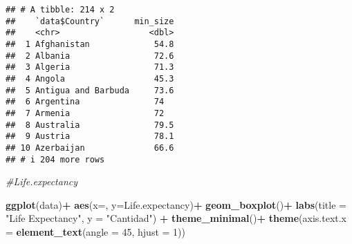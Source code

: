 \documentclass[
]{article}
\newenvironment{Shaded}{\begin{snugshade}}{\end{snugshade}}
\newcommand{\AttributeTok}[1]{\textcolor[rgb]{0.13,0.29,0.53}{#1}}
\newcommand{\CommentTok}[1]{\textcolor[rgb]{0.56,0.35,0.01}{\textit{#1}}}
\newcommand{\ConstantTok}[1]{\textcolor[rgb]{0.56,0.35,0.01}{#1}}
\newcommand{\DecValTok}[1]{\textcolor[rgb]{0.00,0.00,0.81}{#1}}
\newcommand{\FunctionTok}[1]{\textcolor[rgb]{0.13,0.29,0.53}{\textbf{#1}}}
\newcommand{\NormalTok}[1]{#1}
\newcommand{\SpecialCharTok}[1]{\textcolor[rgb]{0.81,0.36,0.00}{\textbf{#1}}}
\newcommand{\StringTok}[1]{\textcolor[rgb]{0.31,0.60,0.02}{#1}}
\begin{document}
\begin{Shaded}
\end{Shaded}

\begin{verbatim}
## # A tibble: 214 x 2
##    `data$Country`      min_size
##    <chr>                  <dbl>
##  1 Afghanistan             54.8
##  2 Albania                 72.6
##  3 Algeria                 71.3
##  4 Angola                  45.3
##  5 Antigua and Barbuda     73.6
##  6 Argentina               74  
##  7 Armenia                 72  
##  8 Australia               79.5
##  9 Austria                 78.1
## 10 Azerbaijan              66.6
## # i 204 more rows
\end{verbatim}

\begin{Shaded}
\begin{Highlighting}[]
\CommentTok{\#Life.expectancy}

\FunctionTok{ggplot}\NormalTok{(data)}\SpecialCharTok{+}
  \FunctionTok{aes}\NormalTok{(}\AttributeTok{x=}\NormalTok{, }\AttributeTok{y=}\NormalTok{Life.expectancy)}\SpecialCharTok{+}
  \FunctionTok{geom\_boxplot}\NormalTok{()}\SpecialCharTok{+}
  \FunctionTok{labs}\NormalTok{(}\AttributeTok{title =} \StringTok{"Life Expectancy"}\NormalTok{, }\AttributeTok{y =} \StringTok{"Cantidad"}\NormalTok{) }\SpecialCharTok{+}
  \FunctionTok{theme\_minimal}\NormalTok{()}\SpecialCharTok{+}
  \FunctionTok{theme}\NormalTok{(}\AttributeTok{axis.text.x =} \FunctionTok{element\_text}\NormalTok{(}\AttributeTok{angle =} \DecValTok{45}\NormalTok{, }\AttributeTok{hjust =} \DecValTok{1}\NormalTok{))}
\end{Highlighting}
\end{Shaded}
\end{document}
